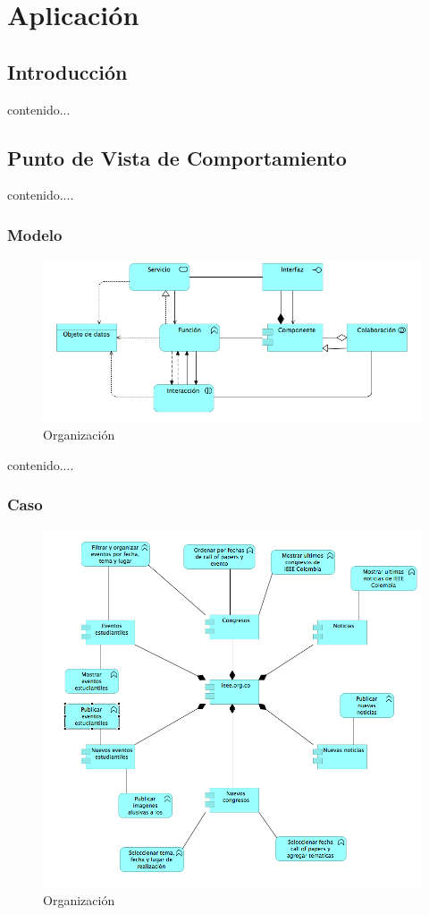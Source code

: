 \chapter{Aplicación}
\section{Introducción}
contenido...
\newpage
\section{Punto de Vista de Comportamiento}
contenido....
\subsection{Modelo}
\begin{figure}[th!]
	\centering
	\includegraphics[width=0.8\linewidth]{arquitectura_diseno/imgs/M_ComportamientoAplicacion}
	\caption{Organización}
\end{figure}
\newpage
contenido....
\subsection{Caso}
\begin{figure}[th!]
	\centering
	\includegraphics[width=0.8\linewidth]{arquitectura_diseno/imgs/C_ComportamientoAplicacion}
	\caption{Organización}
\end{figure}
\newpage
